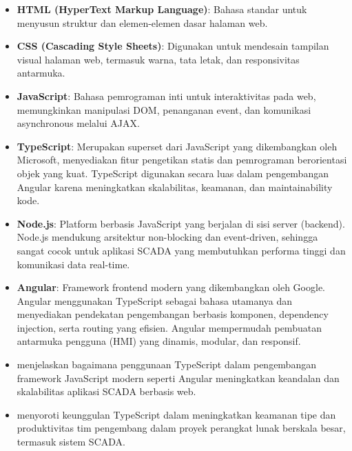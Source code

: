 \begin{itemize}
    \item \textbf{HTML (HyperText Markup Language)}: Bahasa standar untuk menyusun struktur dan elemen-elemen dasar halaman web.
    
    \item \textbf{CSS (Cascading Style Sheets)}: Digunakan untuk mendesain tampilan visual halaman web, termasuk warna, tata letak, dan responsivitas antarmuka.
    
    \item \textbf{JavaScript}: Bahasa pemrograman inti untuk interaktivitas pada web, memungkinkan manipulasi DOM, penanganan event, dan komunikasi asynchronous melalui AJAX.
    
    \item \textbf{TypeScript}: Merupakan superset dari JavaScript yang dikembangkan oleh Microsoft, menyediakan fitur pengetikan statis dan pemrograman berorientasi objek yang kuat. TypeScript digunakan secara luas dalam pengembangan Angular karena meningkatkan skalabilitas, keamanan, dan maintainability kode.
    
    \item \textbf{Node.js}: Platform berbasis JavaScript yang berjalan di sisi server (backend). Node.js mendukung arsitektur non-blocking dan event-driven, sehingga sangat cocok untuk aplikasi SCADA yang membutuhkan performa tinggi dan komunikasi data real-time.
    
    \item \textbf{Angular}: Framework frontend modern yang dikembangkan oleh Google. Angular menggunakan TypeScript sebagai bahasa utamanya dan menyediakan pendekatan pengembangan berbasis komponen, dependency injection, serta routing yang efisien. Angular mempermudah pembuatan antarmuka pengguna (HMI) yang dinamis, modular, dan responsif.
    
    \item \textcite{emmanni2025typescript} menjelaskan bagaimana penggunaan TypeScript dalam pengembangan framework JavaScript modern seperti Angular meningkatkan keandalan dan skalabilitas aplikasi SCADA berbasis web.
    
    \item \textcite{scarsbrook2023typescript} menyoroti keunggulan TypeScript dalam meningkatkan keamanan tipe dan produktivitas tim pengembang dalam proyek perangkat lunak berskala besar, termasuk sistem SCADA.

\end{itemize}


